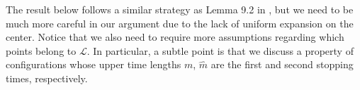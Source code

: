 \documentclass[a4paper,11pt,reqno]{amsart}
\newcommand{\TT}{{\mathbb{T}^2}}
\newcommand{\cL}{{\mathcal L}}
\newcommand{\cW}{{\mathcal W}}
\newcommand{\tix}{\tilde{x}}
\newcommand{\w}{\widetilde{\cW}}
\theoremstyle{definition}
\begin{document}

The result below follows a similar strategy as Lemma 9.2 in \cite{ALOS}, but we need to be much more careful in our argument due to the lack of uniform expansion on the center. Notice that we also need to require more assumptions regarding which points belong to $\cL$.  In particular, a subtle point is that we discuss a property of configurations whose upper time lengths $m$, $\hat{m}$ are the first and second stopping times, respectively.
\end{document}
